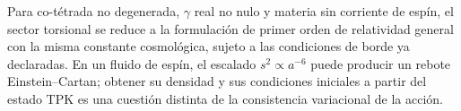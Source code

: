 Para co-tétrada no degenerada, \(\gamma\) real no nulo y materia sin corriente
de espín, el sector torsional se reduce a la formulación de primer orden de
relatividad general con la misma constante cosmológica, sujeto a las
condiciones de borde ya declaradas. En un fluido de espín, el escalado
\(s^2\propto a^{-6}\) puede producir un rebote Einstein--Cartan; obtener su
densidad y sus condiciones iniciales a partir del estado TPK es una cuestión
distinta de la consistencia variacional de la acción.
